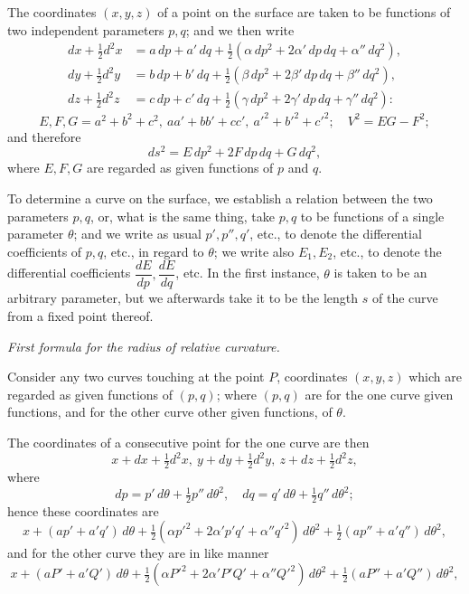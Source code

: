 \documentclass[11pt]{article}
\begin{document}
The coordinates $(x, y, z)$ of a point on the surface are taken to be functions of
two independent parameters $p, q$; and we then write
\begin{align*}
dx + \tfrac{1}{2}d^2x &= a\,dp + a'\,dq + \tfrac{1}{2}(\alpha\,dp^2 + 2\alpha'\,dp\,dq + \alpha''\,dq^2), \\
dy + \tfrac{1}{2}d^2y &= b\,dp + b'\,dq + \tfrac{1}{2}(\beta\,dp^2 + 2\beta'\,dp\,dq + \beta''\,dq^2), \\
dz + \tfrac{1}{2}d^2z &= c\,dp + c'\,dq + \tfrac{1}{2}(\gamma\,dp^2 + 2\gamma'\,dp\,dq + \gamma''\,dq^2):
\end{align*}
\[
E, F, G = a^2 + b^2 + c^2,\ aa' + bb' + cc',\ a'^2 + b'^2 + c'^2;\quad V^2 = EG - F^2;
\]
and therefore
\[
ds^2 = E\,dp^2 + 2F\,dp\,dq + G\,dq^2,
\]
where $E, F, G$ are regarded as given functions of $p$ and $q$.

To determine a curve on the surface, we establish a relation between the two
parameters $p, q$, or, what is the same thing, take $p, q$ to be functions of a single
parameter $\theta$; and we write as usual $p', p'', q'$, etc., to denote the differential
coefficients of $p, q$, etc., in regard to $\theta$; we write also $E_1, E_2$, etc., to denote the
differential coefficients $\dfrac{dE}{dp}, \dfrac{dE}{dq}$, etc. In the first instance, $\theta$ is taken to be an
arbitrary parameter, but we afterwards take it to be the length $s$ of the curve from
a fixed point thereof.

\begin{center}\textit{First formula for the radius of relative curvature.}\end{center}

Consider any two curves touching at the point $P$, coordinates $(x, y, z)$ which
are regarded as given functions of $(p, q)$; where $(p, q)$ are for the one curve given
functions, and for the other curve other given functions, of $\theta$.

The coordinates of a consecutive point for the one curve are then
\[
x + dx + \tfrac{1}{2}d^2x,\ y + dy + \tfrac{1}{2}d^2y,\ z + dz + \tfrac{1}{2}d^2z,
\]
where
\[
dp = p'\,d\theta + \tfrac{1}{2}p''\,d\theta^2,\quad dq = q'\,d\theta + \tfrac{1}{2}q''\,d\theta^2;
\]
hence these coordinates are
\[
x + (ap' + a'q')\,d\theta + \tfrac{1}{2}(\alpha p'^2 + 2\alpha' p'q' + \alpha'' q'^2)\,d\theta^2 + \tfrac{1}{2}(ap'' + a'q'')\,d\theta^2,
\]
and for the other curve they are in like manner
\[
x + (aP' + a'Q')\,d\theta + \tfrac{1}{2}(\alpha P'^2 + 2\alpha' P'Q' + \alpha'' Q'^2)\,d\theta^2 + \tfrac{1}{2}(aP'' + a'Q'')\,d\theta^2,
\]
\end{document}

